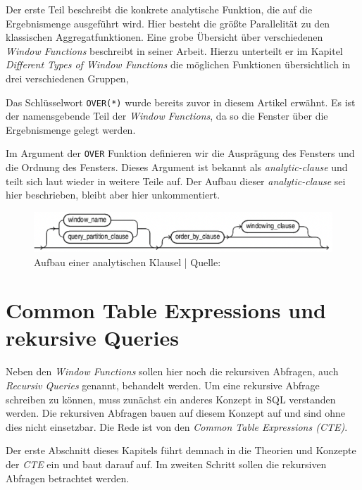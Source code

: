 Der erste Teil beschreibt die konkrete analytische Funktion, die auf die Ergebnismenge
ausgeführt wird. Hier besteht die größte Parallelität zu den klassischen
Aggregatfunktionen. Eine grobe Übersicht über verschiedenen \textit{Window
Functions} beschreibt \cite{ibrahaim23} in seiner Arbeit. Hierzu unterteilt er im
Kapitel \textit{Different Types of Window Functions} die möglichen Funktionen
übersichtlich in drei verschiedenen Gruppen,

Das Schlüsselwort \texttt{OVER(*)} wurde bereits zuvor in diesem Artikel erwähnt.
Es ist der namensgebende Teil der \textit{Window Functions}, da so die Fenster
über die Ergebnismenge gelegt werden.

Im Argument der \texttt{OVER} Funktion definieren wir die Ausprägung des Fensters
und die Ordnung des Fensters. Dieses Argument ist bekannt als \textit{analytic-clause}
und teilt sich laut \cite{oracle} wieder in weitere Teile auf. Der Aufbau dieser
\textit{analytic-clause} sei hier beschrieben, bleibt aber hier unkommentiert.

\begin{figure}[h]
	\centering
	\includegraphics[scale=0.5]{img/aufbauAnalyticClausel.jpg}
	\caption{ Aufbau einer analytischen Klausel | Quelle: \cite{oracle}}
\end{figure}


\section{Common Table Expressions und rekursive Queries}
Neben den \textit{Window Functions} sollen hier noch die rekursiven Abfragen,
auch \textit{Recursiv Queries} genannt, behandelt werden. Um eine rekursive Abfrage
schreiben zu können, muss zunächst ein anderes Konzept in SQL verstanden werden.
Die rekursiven Abfragen bauen auf diesem Konzept auf und sind ohne dies nicht einsetzbar.
Die Rede ist von den \textit{Common Table Expressions (CTE)}.

Der erste Abschnitt dieses Kapitels führt demnach in die Theorien und Konzepte der
\textit{CTE} ein und baut darauf auf. Im zweiten Schritt sollen die rekursiven Abfragen
betrachtet werden.

